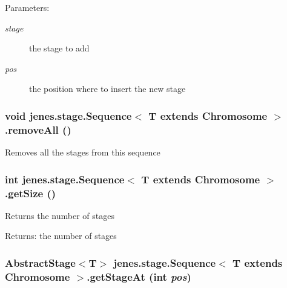 \begin{Desc}
\item[Parameters:]
\begin{description}
\item[{\em stage}]the stage to add \item[{\em pos}]the position where to insert the new stage \end{description}
\end{Desc}
\hypertarget{classjenes_1_1stage_1_1_sequence_3_01_t_01extends_01_chromosome_01_4_b020311ac8fad8d6d884df9634c211b8}{
\subsubsection[removeAll]{\setlength{\rightskip}{0pt plus 5cm}void jenes.stage.Sequence$<$ T extends Chromosome $>$.removeAll ()}}
\label{classjenes_1_1stage_1_1_sequence_3_01_t_01extends_01_chromosome_01_4_b020311ac8fad8d6d884df9634c211b8}


Removes all the stages from this sequence \hypertarget{classjenes_1_1stage_1_1_sequence_3_01_t_01extends_01_chromosome_01_4_f16f419e9be758779fa14cf53f31bfe1}{
\subsubsection[getSize]{\setlength{\rightskip}{0pt plus 5cm}int jenes.stage.Sequence$<$ T extends Chromosome $>$.getSize ()}}
\label{classjenes_1_1stage_1_1_sequence_3_01_t_01extends_01_chromosome_01_4_f16f419e9be758779fa14cf53f31bfe1}


Returns the number of stages \begin{Desc}
\item[Returns:]the number of stages \end{Desc}
\hypertarget{classjenes_1_1stage_1_1_sequence_3_01_t_01extends_01_chromosome_01_4_a9e1d97737fed4c5141cda315c216b32}{
\subsubsection[getStageAt]{\setlength{\rightskip}{0pt plus 5cm}AbstractStage$<$T$>$ jenes.stage.Sequence$<$ T extends Chromosome $>$.getStageAt (int {\em pos})}}
\label{classjenes_1_1stage_1_1_sequence_3_01_t_01extends_01_chromosome_01_4_a9e1d97737fed4c5141cda315c216b32}



